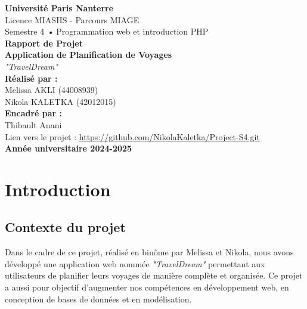 \documentclass[a4paper,12pt]{article}
\begin{document}
\begin{titlepage}
    \centering
    {\Large \textbf{Université Paris Nanterre}}\\[0.5cm]
    {\large Licence MIASHS - Parcours MIAGE}\\[0.2cm]
    {\large Semestre 4 \textsl{•} Programmation web et introduction PHP}\\[2cm]

    {\huge \textbf{Rapport de Projet}}\\[0.5cm]
    {\LARGE \textbf{Application de Planification de Voyages}}\\[0.5cm]
    {\LARGE \textit{"TravelDream"}}\\[2cm]

    \textbf{Réalisé par :}\\
    Melissa AKLI (44008939) \\
    Nikola KALETKA (42012015) \\[0.5cm]

    \textbf{Encadré par :}\\
    Thibault Anani \\[2cm]
    
    
    Lien vers le projet : \url{https://github.com/NikolaKaletka/Project-S4.git}\\

    \vfill
    \textbf{Année universitaire 2024-2025}
\end{titlepage}

\newpage
\tableofcontents
\newpage

\section{Introduction}

\subsection{Contexte du projet}
Dans le cadre de ce projet, réalisé en binôme par Melissa et Nikola, nous avons développé une application web nommée \textit{"TravelDream"} permettant aux utilisateurs de planifier leurs voyages de manière complète et organisée. Ce projet a aussi pour objectif d'augmenter nos compétences en développement web, en conception de bases de données et en modélisation.
\end{document}
